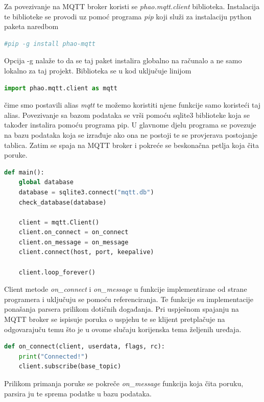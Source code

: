 \documentclass[times, utf8, zavrsni]{fer}
\begin{document}
Za povezivanje na MQTT broker koristi se \textit{phao.mqtt.client} biblioteka.
Instalacija te biblioteke se provodi uz pomoć programa \textit{pip} koji služi za instalaciju python paketa naredbom
\begin{lstlisting}[language=Bash]
    #pip -g install phao-mqtt
\end{lstlisting}
Opcija -g nalaže to da se taj paket instalira globalno na računalo a ne samo lokalno za taj projekt.
Biblioteka se u kod uključuje linijom
\begin{lstlisting}[language=Python]
    import phao.mqtt.client as mqtt
\end{lstlisting}
čime smo postavili alias \textit{mqtt} te možemo koristiti njene funkcije samo koristeći taj alias.
Povezivanje sa bazom podataka se vrši pomoću sqlite3 biblioteke koja se također instalira pomoću programa pip.
U glavnome djelu programa se povezuje na bazu podataka koja se izrađuje ako ona ne postoji te se provjerava postojanje tablica.
Zatim se spaja na MQTT broker i pokreće se beskonačna petlja koja čita poruke.
\begin{lstlisting}[language=Python, caption=Main funkcija programskog koda]
def main():
    global database
    database = sqlite3.connect("mqtt.db")
    check_database(database)

    client = mqtt.Client()
    client.on_connect = on_connect
    client.on_message = on_message
    client.connect(host, port, keepalive)

    client.loop_forever()
\end{lstlisting}
Client metode \textit{on\_connect} i \textit{on\_message} u funkcije implementirane od strane programera i uključuju se pomoću referenciranja.
Te funkcije su implementacije ponašanja parsera prilikom dotičnih događanja.
Pri uspješnom spajanju na MQTT broker se ispisuje poruka o uspjehu te se klijent pretplačuje na odgovarajuču temu što je u ovome slučaju korijenska tema željenih uređaja.
\begin{lstlisting}[language=Python, caption=Akcije prilikom spajanja na MQTT broker]
def on_connect(client, userdata, flags, rc):
    print("Connected!")
    client.subscribe(base_topic)
\end{lstlisting}
Prilikom primanja poruke se pokreče \textit{on\_message} funkcija koja čita poruku, parsira ju te sprema podatke u bazu podataka.
\end{document}
